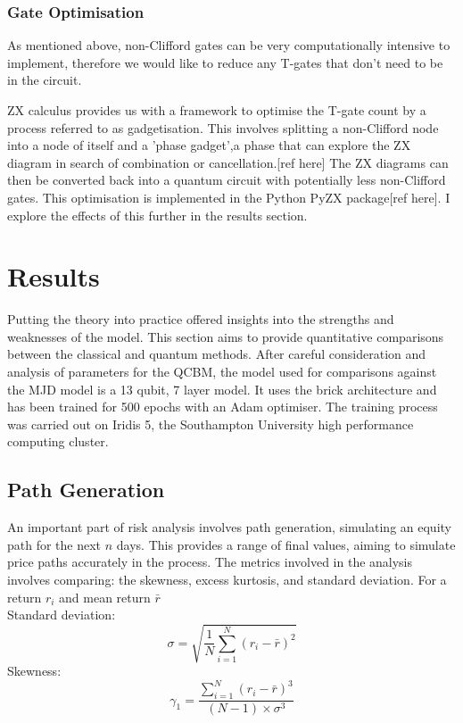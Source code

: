 \documentclass[12pt]{article}
\newcommand{\newp}
    {
    \vskip 0.5cm 
  }
\numberwithin{equation}{section}
\begin{document}
\subsubsection{Gate Optimisation}
As mentioned above, non-Clifford gates can be very computationally intensive to 
implement, therefore we would like to reduce any T-gates that don't need to be 
in the circuit. 
\newp 
ZX calculus provides us with a framework to optimise the T-gate count by a process
referred to as gadgetisation. This involves splitting a non-Clifford node into a 
node of itself and a 'phase gadget',a phase that can explore the ZX diagram in 
search of combination or cancellation.[ref here] The ZX diagrams can then be converted back 
into a quantum circuit with potentially less non-Clifford gates. This optimisation 
is implemented in the Python PyZX package[ref here]. I explore the effects of this 
further in the results section.
\newpage
\section{Results}
Putting the theory into practice offered insights into the strengths and weaknesses 
of the model. This section aims to provide quantitative comparisons between the 
classical and quantum methods. After careful consideration and analysis of parameters 
for the QCBM, the model used for comparisons against the MJD model is a 13 qubit,
7 layer model. It uses the brick architecture and has been trained for 500 epochs 
with an Adam optimiser. The training process was carried out on Iridis 5, the 
Southampton University high performance computing cluster\autocite{iridis5}.
\subsection{Path Generation}
An important part of risk analysis involves path generation, simulating an equity 
path for the next $n$ days. This provides a range of final values, aiming to 
simulate price paths accurately in the process. The metrics involved in the analysis 
involves comparing: the skewness, excess kurtosis, and standard deviation. 
For a return $r_i$ and mean return $\bar{r}$ 
\\Standard deviation:
$$
\sigma = \sqrt{\frac{1}{N} \sum_{i=1}^{N} (r_i - \bar{r})^2}
$$
Skewness:
$$
\gamma_1 = \frac{\sum_{i=1}^{N} (r_i - \bar{r})^3}{(N-1) \times \sigma^3}
$$
\end{document}
